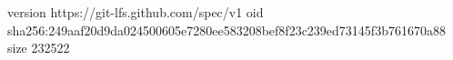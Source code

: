 version https://git-lfs.github.com/spec/v1
oid sha256:249aaf20d9da024500605e7280ee583208bef8f23c239ed73145f3b761670a88
size 232522
